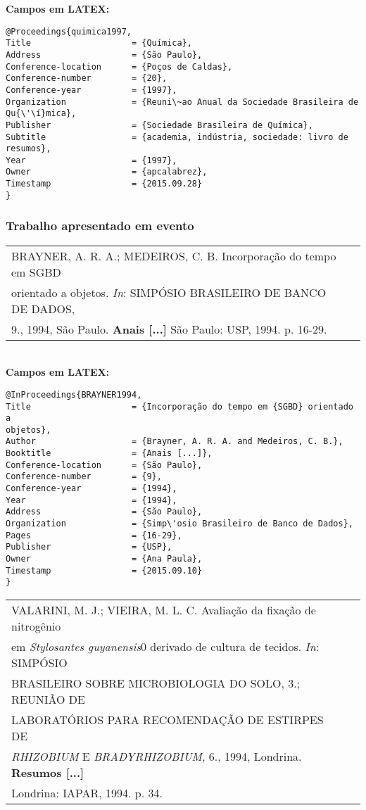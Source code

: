 \textbf{Campos em LATEX:} 

\begin{verbatim}
@Proceedings{quimica1997,
Title                    = {Química},
Address                  = {São Paulo},
Conference-location      = {Poços de Caldas},
Conference-number        = {20},
Conference-year          = {1997},
Organization             = {Reuni\~ao Anual da Sociedade Brasileira de 
Qu{\'\í}mica},
Publisher                = {Sociedade Brasileira de Química},
Subtitle                 = {academia, indústria, sociedade: livro de 
resumos},
Year                     = {1997},
Owner                    = {apcalabrez},
Timestamp                = {2015.09.28}
}
\end{verbatim}

\subsubsection{Trabalho apresentado em evento}

\begin{tabular}{|l|c|} \hline
	BRAYNER, A. R. A.; MEDEIROS, C. B. Incorporação do tempo em SGBD \\orientado a objetos. \textit{In}: SIMPÓSIO BRASILEIRO DE BANCO DE DADOS, \\9., 1994, São Paulo. \textbf{Anais [...]} São Paulo: USP, 1994. p. 16-29.  \\\hline
\end{tabular} \\

\textbf{Campos em LATEX:} 

\begin{verbatim}
@InProceedings{BRAYNER1994,
Title                    = {Incorporação do tempo em {SGBD} orientado a 
objetos},
Author                   = {Brayner, A. R. A. and Medeiros, C. B.},
Booktitle                = {Anais [...]},
Conference-location      = {São Paulo},
Conference-number        = {9},
Conference-year          = {1994},
Year                     = {1994},
Address                  = {São Paulo},
Organization             = {Simp\'osio Brasileiro de Banco de Dados},
Pages                    = {16-29},
Publisher                = {USP},
Owner                    = {Ana Paula},
Timestamp                = {2015.09.10}
}
\end{verbatim}

\begin{tabular}{|l|c|} \hline
	VALARINI, M. J.; VIEIRA, M. L. C. Avaliação da fixação de nitrogênio \\ em \textit{Stylosantes guyanensis}0 derivado de cultura de tecidos. \textit{In}: SIMPÓSIO \\ BRASILEIRO SOBRE MICROBIOLOGIA DO SOLO, 3.; REUNIÃO DE \\ LABORATÓRIOS PARA RECOMENDAÇÃO DE ESTIRPES DE \\ \textit{RHIZOBIUM} E \textit{BRADYRHIZOBIUM}, 6., 1994, Londrina. \textbf{Resumos [...]} \\ Londrina: IAPAR, 1994. p. 34. \\\hline
\end{tabular} \\

